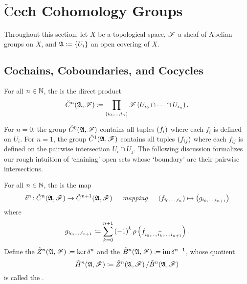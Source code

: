\documentclass[../Moduli_Spaces_of_Riemann_Surfaces.tex]{subfiles}
\begin{document}
    \section{$\check{\textrm{C}}$ech Cohomology Groups}
    Throughout this section, let $X$ be a topological space, $\mathscr{F}$ a sheaf of Abelian groups on $X$, and $\mathfrak{A}\coloneqq\left\{U_i\right\}$ an open covering of $X$.
    \subsection{Cochains, Coboundaries, and Cocycles}
    \begin{definition}
        For all $n\in\mathbb{N}$, the  is the direct product
        \begin{equation*}
            \check{C}^n\!\left(\mathfrak{A},\mathscr{F}\right)\coloneqq\prod_{\left(i_0,\dots,i_n\right)}\mathscr{F}\left(U_{i_0}\cap\cdots\cap U_{i_n}\right).
        \end{equation*}
    \end{definition}
    \begin{remark}
        For $n=0$, the group $\check{C}^0\!\left(\mathfrak{A},\mathscr{F}\right)$ contains all tuples $\left(f_i\right)$ where each $f_i$ is defined on $U_i$. For $n=1$, the group $\check{C}^1\!\left(\mathfrak{A},\mathscr{F}\right)$ contains all tuples $\left(f_{ij}\right)$ where each $f_{ij}$ is defined on the pairwise intersection $U_i\cap U_j$. The following discussion formalizes our rough intuition of `chaining' open sets whose `boundary' are their pairwise intersections.\exqed
    \end{remark}
    \begin{definition}
        For all $n\in\mathbb{N}$, the  is the map
        \begin{equation*}
            \delta^n\!:\check{C}^n\!\l(\mf{A},\ms{F}\r)\to\check{C}^{n+1}\!\l(\mf{A},\ms{F}\r)\ \ \ \ \textrm{\it{mapping}}\ \ \ \ \l(f_{i_0,\dots,i_n}\r)\mapsto\l(g_{i_0,\dots,i_{n+1}}\r)
        \end{equation*}
        where
        \begin{equation*}
            g_{i_0,\dots,i_{n+1}}\coloneqq\sum_{k=0}^{n+1}\left(-1\right)^k\rho\left(f_{i_0,\dots,\widehat{i_k},\dots,i_{n+1}}\right).
        \end{equation*}
        Define the  $\check{Z}^n\!\left(\mathfrak{A},\mathscr{F}\right)\coloneqq\ker\delta^n$ and the  $\check{B}^n\!\left(\mathfrak{A},\mathscr{F}\right)\coloneqq\operatorname{im}\delta^{n-1}$, whose quotient
        \begin{equation*}
            \check{H}^n\!\left(\mathfrak{A},\mathscr{F}\right)\coloneqq\check{Z}^n\!\left(\mathfrak{A},\mathscr{F}\right)/\check{B}^n\!\left(\mathfrak{A},\mathscr{F}\right)
        \end{equation*}
        is called the .
    \end{definition}
\end{document}
